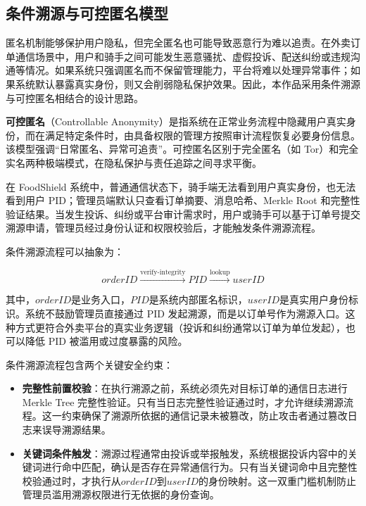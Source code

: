 \subsection{条件溯源与可控匿名模型}

匿名机制能够保护用户隐私，但完全匿名也可能导致恶意行为难以追责。在外卖订单通信场景中，用户和骑手之间可能发生恶意骚扰、虚假投诉、配送纠纷或违规沟通等情况。如果系统只强调匿名而不保留管理能力，平台将难以处理异常事件；如果系统默认暴露真实身份，则又会削弱隐私保护效果。因此，本作品采用条件溯源与可控匿名相结合的设计思路。

\textbf{可控匿名}（Controllable Anonymity）是指系统在正常业务流程中隐藏用户真实身份，而在满足特定条件时，由具备权限的管理方按照审计流程恢复必要身份信息。该模型强调“日常匿名、异常可追责”。可控匿名区别于完全匿名（如 Tor）和完全实名两种极端模式，在隐私保护与责任追踪之间寻求平衡。

在 FoodShield 系统中，普通通信状态下，骑手端无法看到用户真实身份，也无法看到用户 PID；管理员端默认只查看订单摘要、消息哈希、Merkle Root 和完整性验证结果。当发生投诉、纠纷或平台审计需求时，用户或骑手可以基于订单号提交溯源申请，管理员经过身份认证和权限校验后，才能触发条件溯源流程。

条件溯源流程可以抽象为：

\begin{equation}
\mathit{orderID} \xrightarrow{\operatorname{verify\text{-}integrity}} \mathit{PID} \xrightarrow{\operatorname{lookup}} \mathit{userID}
\end{equation}

其中，$\mathit{orderID}$是业务入口，$\mathit{PID}$是系统内部匿名标识，$\mathit{userID}$是真实用户身份标识。系统不鼓励管理员直接通过 PID 发起溯源，而是以订单号作为溯源入口。这种方式更符合外卖平台的真实业务逻辑（投诉和纠纷通常以订单为单位发起），也可以降低 PID 被滥用或过度暴露的风险。

条件溯源流程包含两个关键安全约束：

\begin{itemize}[leftmargin=2em]
\item \textbf{完整性前置校验}：在执行溯源之前，系统必须先对目标订单的通信日志进行 Merkle Tree 完整性验证。只有当日志完整性验证通过时，才允许继续溯源流程。这一约束确保了溯源所依据的通信记录未被篡改，防止攻击者通过篡改日志来误导溯源结果。
\item \textbf{关键词条件触发}：溯源过程通常由投诉或举报触发，系统根据投诉内容中的关键词进行命中匹配，确认是否存在异常通信行为。只有当关键词命中且完整性校验通过时，才执行从$\mathit{orderID}$到$\mathit{userID}$的身份映射。这一双重门槛机制防止管理员滥用溯源权限进行无依据的身份查询。
\end{itemize}

